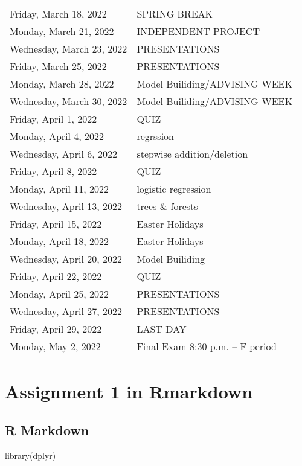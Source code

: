 \documentclass[
]{book}
\newenvironment{Shaded}{\begin{snugshade}}{\end{snugshade}}
\newcommand{\FunctionTok}[1]{\textcolor[rgb]{0.00,0.00,0.00}{#1}}
\newcommand{\NormalTok}[1]{#1}
\begin{document}
\begin{longtable}[]{@{}ll@{}}
Friday, March 18, 2022 & SPRING BREAK \\
Monday, March 21, 2022 & INDEPENDENT PROJECT \\
Wednesday, March 23, 2022 & PRESENTATIONS \\
Friday, March 25, 2022 & PRESENTATIONS \\
Monday, March 28, 2022 & Model Builiding/ADVISING WEEK \\
Wednesday, March 30, 2022 & Model Builiding/ADVISING WEEK \\
Friday, April 1, 2022 & QUIZ \\
Monday, April 4, 2022 & regrssion \\
Wednesday, April 6, 2022 & stepwise addition/deletion \\
Friday, April 8, 2022 & QUIZ \\
Monday, April 11, 2022 & logistic regression \\
Wednesday, April 13, 2022 & trees \& forests \\
Friday, April 15, 2022 & Easter Holidays \\
Monday, April 18, 2022 & Easter Holidays \\
Wednesday, April 20, 2022 & Model Builiding \\
Friday, April 22, 2022 & QUIZ \\
Monday, April 25, 2022 & PRESENTATIONS \\
Wednesday, April 27, 2022 & PRESENTATIONS \\
Friday, April 29, 2022 & LAST DAY \\
Monday, May 2, 2022 & Final Exam 8:30 p.m. -- F period \\
\bottomrule
\end{longtable}

\hypertarget{assignment-1-in-rmarkdown}{%
\chapter{Assignment 1 in Rmarkdown}\label{assignment-1-in-rmarkdown}}

\hypertarget{r-markdown}{%
\section{R Markdown}\label{r-markdown}}

\begin{Shaded}
\begin{Highlighting}[]
\FunctionTok{library}\NormalTok{(dplyr)}
\end{Highlighting}
\end{Shaded}
\end{document}
